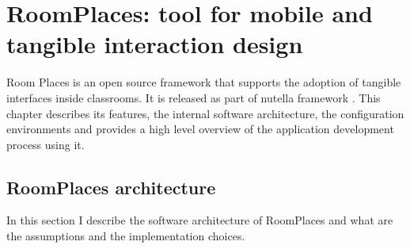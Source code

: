 \chapter{RoomPlaces: tool for mobile and tangible interaction design}

\label{chap:room_places}

Room Places is an open source framework that supports the adoption of tangible interfaces inside classrooms. It is released as part of nutella framework \cite{nutella_framework}. This chapter describes its features, the internal software architecture, the configuration environments and provides a high level overview of the application development process using it.

\section{RoomPlaces architecture}
In this section I describe the software architecture of RoomPlaces and what are the assumptions and the implementation choices.

